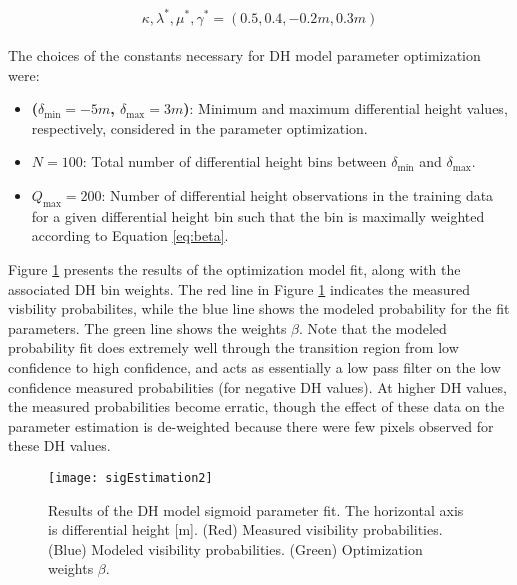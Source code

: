 \large
\begin{equation} 
\kappa, \lambda^*, \mu^*, \gamma^* = (0.5, 0.4, -0.2m, 0.3m)
\label{eq:fitParams}
\end{equation}
\normalsize
\\
The choices of the constants necessary for DH model parameter optimization were:

\begin{itemize}
\item \textbf{($\delta_{\text{min}} = -5m$, $\delta_{\text{max}} = 3m$)}: Minimum and maximum differential height values, respectively, considered in the parameter optimization.
\item \textbf{$N = 100$}: Total number of differential height bins between $\delta_{\text{min}}$ and $\delta_{\text{max}}$.
\item \textbf{$Q_{\text{max}} = 200$}: Number of differential height observations in the training data for a given differential height bin such that the bin is maximally weighted according to Equation \ref{eq:beta}. 
\end{itemize} 

Figure \ref{fig:optResult} presents the results of the optimization model fit, along with the associated DH bin weights.  
The red line in Figure \ref{fig:optResult} indicates the measured visbility probabilites, while the blue line shows the modeled probability for the fit parameters.  The green line shows the weights $\beta$.  Note that the modeled probability fit does extremely well through the transition region from low confidence to high confidence, and acts as essentially a low pass filter on the low confidence measured probabilities (for negative DH values).   At higher DH values, the measured probabilities become erratic, though the effect of these data on the parameter estimation is de-weighted because there were few pixels observed for these DH values. 

\begin{figure}[!h]
	\centering
		\texttt{[image: sigEstimation2]}
	\caption{Results of the DH model sigmoid parameter fit.  The horizontal axis is differential height [m]. (Red) Measured visibility probabilities. (Blue) Modeled visibility probabilities. (Green) Optimization weights $\beta$. }
	\label{fig:optResult}
\end{figure}


